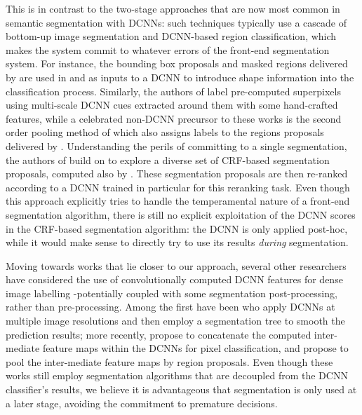 
This is in contrast to the two-stage approaches that are now most common in semantic segmentation with DCNNs: such techniques typically use a cascade of bottom-up image segmentation and DCNN-based region classification, which makes the system commit to whatever errors of the front-end segmentation system.  
For instance, the bounding box proposals and masked regions delivered by \citep{arbelaez2014multiscale, Uijlings13} are used in 
\citet{girshick2014rcnn} and \cite{hariharan2014simultaneous}  as inputs to a DCNN to introduce  shape information into the classification process. Similarly, the authors of  \citet{mostajabi2014feedforward} label pre-computed superpixels using multi-scale DCNN cues extracted around them with some hand-crafted features, while a celebrated  non-DCNN precursor to these  works
is the second order pooling method of \citep{carreira2012semantic} which also assigns labels to the regions proposals delivered by \citep{carreira2012cpmc}. 
Understanding the perils of committing to a single segmentation, the authors of \citet{cogswell2014combining} 
build on \citep{yadollahpour2013discriminative} to explore a diverse set of CRF-based segmentation proposals, computed also by \citep{carreira2012cpmc}. These segmentation proposals are then re-ranked according to a DCNN trained in  particular for this reranking task. Even though this approach explicitly tries to handle the temperamental nature of a front-end segmentation algorithm, there is still no explicit exploitation of the DCNN scores in  the CRF-based segmentation algorithm: the DCNN is only applied post-hoc, while it would make sense to directly try to use its results {\em during} segmentation. 

Moving towards works that lie closer to our approach, several other researchers have considered the use of convolutionally computed DCNN features for dense image labelling -potentially coupled with some segmentation post-processing, rather than pre-processing. Among the first have been
\citet{farabet2013learning} who apply DCNNs at multiple image resolutions and then employ a segmentation tree to smooth the prediction results; more recently, \citet{hariharan2014hypercolumns} propose to concatenate the computed inter-mediate feature maps within the DCNNs for pixel classification, and \citet{dai2014convolutional} propose to pool the inter-mediate feature maps by region proposals. Even though these works still employ  segmentation algorithms that are  decoupled from the DCNN classifier's results, we believe it is advantageous that segmentation is only used at a later stage, avoiding the commitment  to premature decisions. 

